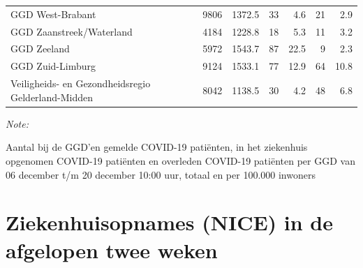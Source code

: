 \documentclass[
  english,
  man,floatsintext]{apa6}
\begin{document}
\begin{table}
\begin{threeparttable}
\begin{tabular}{lrrrrrr}
GGD West-Brabant & 9806 & 1372.5 & 33 & 4.6 & 21 & 2.9\\
GGD Zaanstreek/Waterland & 4184 & 1228.8 & 18 & 5.3 & 11 & 3.2\\
GGD Zeeland & 5972 & 1543.7 & 87 & 22.5 & 9 & 2.3\\
GGD Zuid-Limburg & 9124 & 1533.1 & 77 & 12.9 & 64 & 10.8\\
Veiligheids- en Gezondheidsregio Gelderland-Midden & 8042 & 1138.5 & 30 & 4.2 & 48 & 6.8\\
\bottomrule
\end{tabular}
\begin{tablenotes}
\item \textit{Note: } 
\item Aantal bij de GGD’en gemelde COVID-19 patiënten, in het ziekenhuis opgenomen COVID-19 patiënten en overleden COVID-19 patiënten per GGD van 06 december t/m 20 december 10:00 uur, totaal en per 100.000 inwoners
\end{tablenotes}
\end{threeparttable}
\endgroup{}
\end{table}

\newpage

\hypertarget{ziekenhuisopnames-nice-in-de-afgelopen-twee-weken}{%
\section{Ziekenhuisopnames (NICE) in de afgelopen twee weken}\label{ziekenhuisopnames-nice-in-de-afgelopen-twee-weken}}
\end{document}
